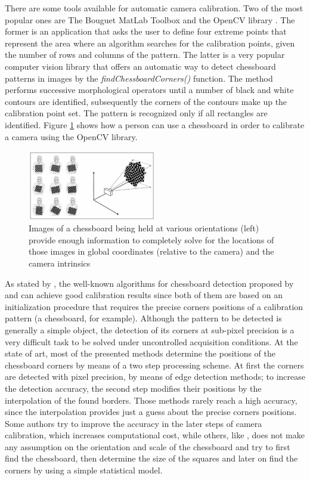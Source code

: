 \documentclass[msc, a4paper, classic, en]{ufbathesis}
\begin{document}
There are some tools available for automatic camera calibration. Two of the most popular ones are The Bouguet MatLab Toolbox \cite{matlab} and the OpenCV library \cite{opencv}. The former is an application that asks the user to define four extreme points that represent the area where an algorithm searches for the calibration points, given the number of rows and columns of the pattern. The latter is a very popular computer vision library that offers an automatic way to detect chessboard patterns in images by the \textit{findChessboardCorners()} function. The method performs successive morphological operators until a number of black and white contours are identified, subsequently the corners of the contours make up the calibration point set. The pattern is recognized only if all rectangles are identified. Figure \ref{fig:chessboard} shows how a person can use a chessboard in order to calibrate a camera using the OpenCV library.

\begin{figure}
\centering
\includegraphics[width=0.5\textwidth]{images/chessboard.png}
\caption{Images of a chessboard being held at various orientations (left) provide enough information to completely solve for the locations of those images in global coordinates (relative to the
\label{fig:chessboard}
camera) and the camera intrinsics \cite{bradski2008learning}}
\end{figure}

As stated by \cite{arca}, the well-known algorithms for chessboard detection proposed by \cite{Tsai86} and \cite{zhang2000flexible} can achieve good calibration results since both of them are based on an initialization procedure that requires the precise corners positions of a calibration pattern (a chessboard, for example). Although the pattern to be detected is generally a simple object, the detection of its corners at sub-pixel precision is a very difficult task to be solved under uncontrolled acquisition conditions. At the state of art, most of the presented methods determine the positions of the chessboard corners by means of a two step processing scheme. At first the corners are detected with pixel precision, by means of edge detection methods; to increase the detection accuracy, the second step modifies their positions by the interpolation of the found borders. Those methods rarely reach a high accuracy, since the interpolation provides just a guess about the precise corners positions. Some authors try to improve the accuracy in the later steps of camera calibration, which increases computational cost, while others, like \cite{arca}, does not make any assumption on the orientation and scale of the chessboard and try to first find the chessboard, then determine the size of the squares and later on find the corners by using a simple statistical model.
\end{document}
